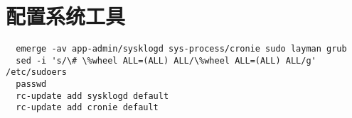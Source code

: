 \chapter{配置系统工具}
\begin{lstlisting}
  emerge -av app-admin/sysklogd sys-process/cronie sudo layman grub
  sed -i 's/\# \%wheel ALL=(ALL) ALL/\%wheel ALL=(ALL) ALL/g' /etc/sudoers
  passwd
  rc-update add sysklogd default
  rc-update add cronie default
\end{lstlisting}
